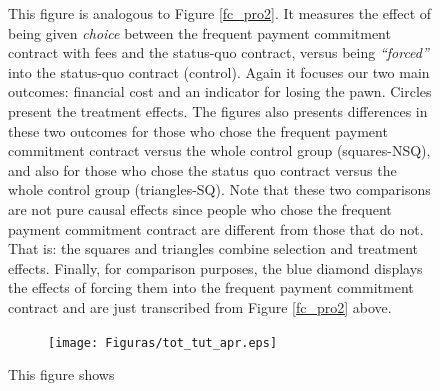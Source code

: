 \documentclass[oneside,11pt]{article}
\begin{document}
\begin{figure}[H]
        This figure is analogous to Figure \ref{fc_pro2}. It measures the effect of being given \textit{choice} between the frequent payment commitment contract with fees and the status-quo contract, versus being \textit{``forced''} into the status-quo contract (control). Again it focuses our two main outcomes: financial cost and an indicator for losing the pawn. Circles present the treatment effects. The figures also presents differences in these two outcomes for those who chose the frequent payment commitment contract versus the whole control group (squares-NSQ), and also for those who chose the status quo contract versus the whole control group (triangles-SQ). Note that these two comparisons are not pure causal effects since people who chose the frequent payment commitment contract are different from those that do not. That is: the squares and triangles combine selection and treatment effects. Finally, for comparison purposes, the blue diamond displays the effects of forcing them into the frequent payment commitment contract and are just transcribed from Figure \ref{fc_pro2} above. 
\end{figure}

\cleardoublepage



\begin{figure}[H]
     \caption{ToT \& TuT as LATE}
    \label{tot_tut_graph}
    \begin{center}
    \begin{subfigure}{0.9\textwidth}
        \centering
        \texttt{[image: Figuras/tot\_tut\_apr.eps]}
    \end{subfigure}
    \end{center}
    \scriptsize
    This figure shows 
\end{figure}
\end{document}

